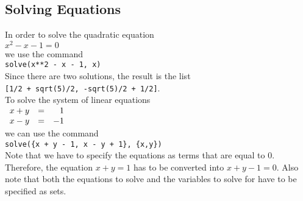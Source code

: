 \documentclass{article}
\begin{document}
\subsection{Solving Equations}
In order to solve the quadratic equation
\\[0.2cm]
\hspace*{1.3cm}
$x^2 - x - 1 = 0$
\\[0.2cm]
we use the command
\\[0.2cm]
\hspace*{1.3cm}
\texttt{solve(x**2 - x - 1, x)}
\\[0.2cm]
Since there are two solutions, the result is the list
\\[0.2cm]
\hspace*{1.3cm}
\texttt{[1/2 + sqrt(5)/2, -sqrt(5)/2 + 1/2]}.
\\[0.2cm]
To solve the system of linear equations
\\[0.2cm]
\hspace*{1.3cm}
$
\begin{array}[t]{lcr}
  x + y & = &  1 \\
  x - y & = & -1
\end{array}
$
\\[0.2cm]
we can use the command
\\[0.2cm]
\hspace*{1.3cm}
\texttt{solve(\{x + y - 1, x - y + 1\}, \{x,y\})}
\\[0.2cm]
Note that we have to specify the equations as terms that are equal to $0$.  Therefore, the equation
$x + y = 1$ has to be converted into $x + y - 1 = 0$.  Also note that both the equations to solve
and the variables to solve for have to be 
specified as sets.
\end{document}
